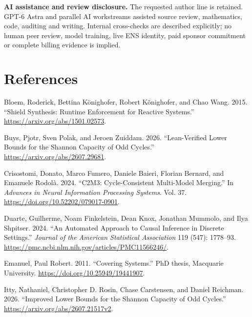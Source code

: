 \documentclass[11pt,a4paper]{article}
\newenvironment{CSLReferences}[2]{\begingroup\small\raggedright\setlength{\parskip}{0.5em}\setlength{\parindent}{0pt}}{\endgroup}
\begin{document}
\textbf{AI assistance and review disclosure.} The requested author line
is retained. GPT-6 Astra and parallel AI workstreams assisted source
review, mathematics, code, auditing and writing. Internal cross-checks
are described explicitly; no human peer review, model training, live ENS
identity, paid sponsor commitment or complete billing evidence is
implied.


\hypertarget{references}{%
\section{References}\label{references}}

\hypertarget{refs}{}
\begin{CSLReferences}{1}{0}
\leavevmode{}%
Bloem, Roderick, Bettina Könighofer, Robert Könighofer, and Chao Wang.
2015. {``Shield Synthesis: Runtime Enforcement for Reactive Systems.''}
\url{https://arxiv.org/abs/1501.02573}.

\leavevmode{}%
Buys, Pjotr, Sven Polak, and Jeroen Zuiddam. 2026. {``Lean-Verified
Lower Bounds for the Shannon Capacity of Odd Cycles.''}
\url{https://arxiv.org/abs/2607.29681}.

\leavevmode{}%
Crisostomi, Donato, Marco Fumero, Daniele Baieri, Florian Bernard, and
Emanuele Rodolà. 2024. {``{C2M3}: Cycle-Consistent Multi-Model
Merging.''} In \emph{Advances in Neural Information Processing Systems}.
Vol. 37. \url{https://doi.org/10.52202/079017-0901}.

\leavevmode{}%
Duarte, Guilherme, Noam Finkelstein, Dean Knox, Jonathan Mummolo, and
Ilya Shpitser. 2024. {``An Automated Approach to Causal Inference in
Discrete Settings.''} \emph{Journal of the American Statistical
Association} 119 (547): 1778--93.
\url{https://pmc.ncbi.nlm.nih.gov/articles/PMC11566246/}.

\leavevmode{}%
Emanuel, Paul Robert. 2011. {``Covering Systems.''} PhD thesis,
Macquarie University. \url{https://doi.org/10.25949/19441907}.

\leavevmode{}%
Itty, Nathaniel, Christopher D. Rosin, Chase Carstensen, and Daniel
Reichman. 2026. {``Improved Lower Bounds for the Shannon Capacity of Odd
Cycles.''} \url{https://arxiv.org/abs/2607.21517v2}.


\end{CSLReferences}
\end{document}
